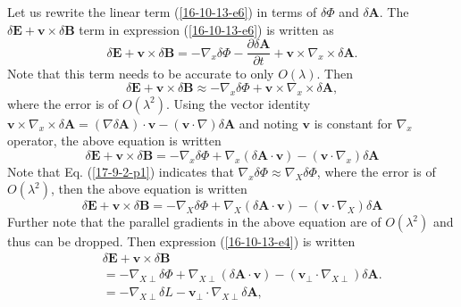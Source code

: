 \documentclass{llncs}
\begin{document}
Let us rewrite the linear term (\ref{16-10-13-e6}) in terms of $\delta \Phi$
and $\delta \mathbf{A}$. The $\delta \mathbf{E}+\mathbf{v} \times \delta
\mathbf{B}$ term in expression (\ref{16-10-13-e6}) is written as
\begin{equation}
  \delta \mathbf{E}+\mathbf{v} \times \delta \mathbf{B}= - \nabla_x \delta
  \Phi - \frac{\partial \delta \mathbf{A}}{\partial t} +\mathbf{v} \times
  \nabla_x \times \delta \mathbf{A}.
\end{equation}
Note that this term needs to be accurate to only $O (\lambda)$. Then
\begin{equation}
  \delta \mathbf{E}+\mathbf{v} \times \delta \mathbf{B} \approx - \nabla_x
  \delta \Phi +\mathbf{v} \times \nabla_x \times \delta \mathbf{A},
\end{equation}
where the error is of $O (\lambda^2)$. Using the vector identity $\mathbf{v}
\times \nabla_x \times \delta \mathbf{A}= (\nabla \delta \mathbf{A}) \cdot
\mathbf{v}- (\mathbf{v} \cdot \nabla) \delta \mathbf{A}$ and noting
$\mathbf{v}$ is constant for $\nabla_x$ operator, the above equation is
written
\begin{equation}
  \delta \mathbf{E}+\mathbf{v} \times \delta \mathbf{B}= - \nabla_x \delta
  \Phi + \nabla_x (\delta \mathbf{A} \cdot \mathbf{v}) - (\mathbf{v} \cdot
  \nabla_x) \delta \mathbf{A}
\end{equation}
Note that Eq. (\ref{17-9-2-p1}) indicates that $\nabla_x \delta \Phi \approx
\nabla_X \delta \Phi$, where the error is of $O (\lambda^2)$, then the above
equation is written
\begin{equation}
  \label{16-10-13-e4} \delta \mathbf{E}+\mathbf{v} \times \delta \mathbf{B}= -
  \nabla_X \delta \Phi + \nabla_X (\delta \mathbf{A} \cdot \mathbf{v}) -
  (\mathbf{v} \cdot \nabla_X) \delta \mathbf{A}
\end{equation}
Further note that the parallel gradients in the above equation are of $O
(\lambda^2)$ and thus can be dropped. Then expression (\ref{16-10-13-e4}) is
written
\begin{eqnarray}
  &  & \delta \mathbf{E}+\mathbf{v} \times \delta \mathbf{B} \nonumber\\
  &  & = - \nabla_{X \perp} \delta \Phi + \nabla_{X \perp} (\delta \mathbf{A}
  \cdot \mathbf{v}) - (\mathbf{v}_{\perp} \cdot \nabla_{X \perp}) \delta
  \mathbf{A}. \nonumber\\
  &  & = - \nabla_{X \perp} \delta L -\mathbf{v}_{\perp} \cdot \nabla_{X
  \perp} \delta \mathbf{A},  \label{18-9-14-e1}
\end{eqnarray}
\end{document}
